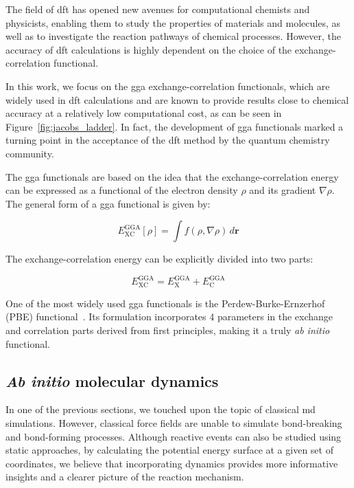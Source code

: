 The field of \ac{dft} has opened new avenues for computational chemists and physicists, enabling them to study the properties of materials and molecules, as well as to investigate the reaction pathways of chemical processes. However, the accuracy of \ac{dft} calculations is highly dependent on the choice of the exchange-correlation functional.

In this work, we focus on the \ac{gga} exchange-correlation functionals, which are widely used in \ac{dft} calculations and are known to provide results close to chemical accuracy at a relatively low computational cost, as can be seen in Figure~\ref{fig:jacobs_ladder}. In fact, the development of \ac{gga} functionals marked a turning point in the acceptance of the \ac{dft} method by the quantum chemistry community.

The \ac{gga} functionals are based on the idea that the exchange-correlation energy can be expressed as a functional of the electron density $\rho$ and its gradient $\nabla \rho$. The general form of a \ac{gga} functional is given by:

\begin{equation}
E_{\text{XC}}^{\text{GGA}}[\rho] = \int f(\rho, \nabla\rho) \, d\mathbf{r}
\label{eq:gga_functional}
\end{equation}

The exchange-correlation energy can be explicitly divided into two parts:

\begin{equation}
E_{\text{XC}}^{\text{GGA}} = E_{\text{X}}^{\text{GGA}} + E_{\text{C}}^{\text{GGA}}
\label{eq:gga_xc}
\end{equation}

One of the most widely used \ac{gga} functionals is the Perdew-Burke-Ernzerhof (PBE) functional~\citep{perdewGeneralizedGradientApproximation1996}. Its formulation incorporates 4 parameters in the exchange and correlation parts derived from first principles, making it a truly \textit{ab initio} functional.



\subsection{\textit{Ab initio} molecular dynamics}
In one of the previous sections, we touched upon the topic of classical \ac{md} simulations. However, classical force fields are unable to simulate bond-breaking and bond-forming processes. Although reactive events can also be studied using static approaches, by calculating the potential energy surface at a given set of coordinates, we believe that incorporating dynamics provides more informative insights and a clearer picture of the reaction mechanism.

